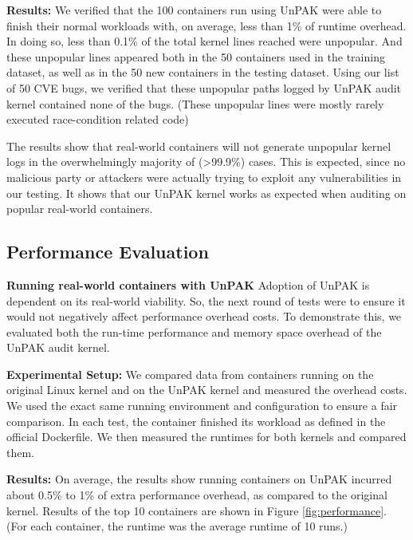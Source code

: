 \textbf{Results:}  We verified that the 100 containers run using UnPAK were able to finish their normal workloads with, on average, less than 1\% of runtime overhead. 
In doing so,  less than 0.1\% of the total kernel lines reached were unpopular. And these unpopular lines appeared both in the 50 containers used in the training dataset, 
as well as in the 50 new containers in the testing dataset. Using our list of 50 CVE bugs, we verified that these unpopular paths logged by UnPAK audit kernel contained none of the bugs. 
(These unpopular lines were mostly rarely executed race-condition related code) 

The results show that real-world containers will not generate unpopular kernel logs in the overwhelmingly majority of (>99.9\%) cases. 
This is expected, since no malicious party or attackers were actually trying to exploit any vulnerabilities in our testing. 
It shows that our UnPAK kernel works as expected when auditing on popular real-world containers. 

\subsection{Performance Evaluation}
\label{sec.evaluation.4} 
\textbf{Running real-world containers with UnPAK}
\newline
Adoption of UnPAK is dependent on its real-world viability. So, the next round of tests were to ensure it would not negatively affect performance overhead costs. 
To demonstrate this, we evaluated both the run-time performance and memory space overhead of the UnPAK audit kernel.

\textbf{Experimental Setup:}
We compared data from containers running on the original Linux kernel and on the 
UnPAK kernel and measured the overhead costs. We used the exact same running environment and configuration to ensure a fair comparison. 
In each test, the container finished its workload as defined in the official Dockerfile. We then measured the runtimes for both kernels and compared them. 

\textbf{Results:} 
On average, the results show running containers on UnPAK incurred about 0.5\% to 1\% of extra performance overhead, as compared to the original kernel. 
Results of the top 10 containers are shown in Figure \ref{fig:performance}. (For each container, the runtime was the average runtime of 10 runs.)

